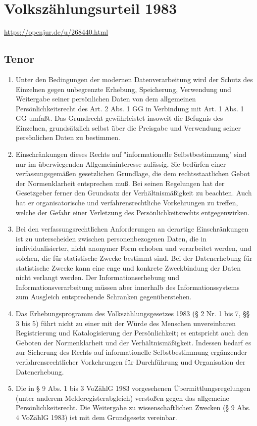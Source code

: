 \chapter{Volkszählungsurteil 1983}
\newline
\url{https://openjur.de/u/268440.html}

    \section{Tenor}
        \begin{enumerate}
            \item Unter den Bedingungen der modernen Datenverarbeitung wird der Schutz des Einzelnen gegen unbegrenzte Erhebung, Speicherung, Verwendung und Weitergabe seiner persönlichen Daten von dem allgemeinen Persönlichkeitsrecht des Art. 2 Abs. 1 GG in Verbindung mit Art. 1 Abs. 1 GG umfaßt. Das Grundrecht gewährleistet insoweit die Befugnis des Einzelnen, grundsätzlich selbst über die Preisgabe und Verwendung seiner persönlichen Daten zu bestimmen.
            \item Einschränkungen dieses Rechts auf "informationelle Selbstbestimmung" sind nur im überwiegenden Allgemeininteresse zulässig. Sie bedürfen einer verfassungsgemäßen gesetzlichen Grundlage, die dem rechtsstaatlichen Gebot der Normenklarheit entsprechen muß. Bei seinen Regelungen hat der Gesetzgeber ferner den Grundsatz der Verhältnismäßigkeit zu beachten. Auch hat er organisatorische und verfahrensrechtliche Vorkehrungen zu treffen, welche der Gefahr einer Verletzung des Persönlichkeitsrechts entgegenwirken.     \item Bei den verfassungsrechtlichen Anforderungen an derartige Einschränkungen ist zu unterscheiden zwischen personenbezogenen Daten, die in individualisierter, nicht anonymer Form erhoben und verarbeitet werden, und solchen, die für statistische Zwecke bestimmt sind. Bei der Datenerhebung für statistische Zwecke kann eine enge und konkrete Zweckbindung der Daten nicht verlangt werden. Der Informationserhebung und Informationsverarbeitung müssen aber innerhalb des Informationssystems zum Ausgleich entsprechende Schranken gegenüberstehen.
            \item Das Erhebungsprogramm des Volkszählungsgesetzes 1983 (§ 2 Nr. 1 bis 7, §§ 3 bis 5) führt nicht zu einer mit der Würde des Menschen unvereinbaren Registrierung und Katalogisierung der Persönlichkeit; es entspricht auch den Geboten der Normenklarheit und der Verhältnismäßigkeit. Indessen bedarf es zur Sicherung des Rechts auf informationelle Selbstbestimmung ergänzender verfahrensrechtlicher Vorkehrungen für Durchführung und Organisation der Datenerhebung. 
            \item Die in § 9 Abs. 1 bis 3 VoZählG 1983 vorgesehenen Übermittlungsregelungen (unter anderem Melderegisterabgleich) verstoßen gegen das allgemeine Persönlichkeitsrecht. Die Weitergabe zu wissenschaftlichen Zwecken (§ 9 Abs. 4 VoZählG 1983) ist mit dem Grundgesetz vereinbar. 
        \end{enumerate}
